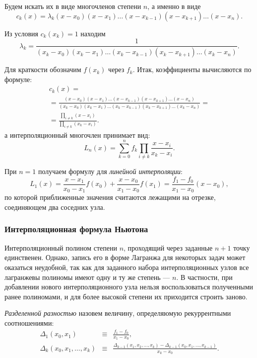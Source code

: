 Будем искать их в виде многочленов степени $n$, а именно в виде
\[
c_{k}(x)=\lambda_{k}(x-x_{0})(x-x_{1})\dots(x-x_{k-1})(x-x_{k+1})\dots(x-x_{n}).
\]


Из условия $c_{k}(x_{k})=1$ находим
\[
\lambda_{k}=\frac{1}{(x_{k}-x_{0})(x_{k}-x_{1})\dots(x_{k}-x_{k-1})(x_{k}-x_{k+1})\dots(x_{k}-x_{n})}.
\]


Для краткости обозначим $f(x_{k})$ через $f_{k}$. Итак, коэффициенты
вычисляются по формуле:
\begin{multline*}
c_{k}(x)=\\
=\frac{(x-x_{0})(x-x_{1})\dots(x-x_{k-1})(x-x_{k+1})\dots(x-x_{n})}{(x_{k}-x_{0})(x_{k}-x_{1})\dots(x_{k}-x_{k-1})(x_{k}-x_{k+1})\dots(x_{k}-x_{n})}=\\
=\frac{\prod_{i\neq k}(x-x_{i})}{\prod_{i\neq k}(x_{k}-x_{i})}.
\end{multline*}
а интерполяционный многочлен принимает вид:
\[
L_{n}(x)=\sum_{k=0}^{n}f_{k}\prod_{i\neq k}\frac{x-x_{i}}{x_{k}-x_{i}}.
\]


При $n=1$ получаем формулу для \emph{линейной интерполяции}:
\[
L_{1}(x)=\frac{x-x_{1}}{x_{0}-x_{1}}f(x_{0})+\frac{x-x_{0}}{x_{1}-x_{0}}f(x_{1})=\frac{f_{1}-f_{0}}{x_{1}-x_{0}}(x-x_{0}),
\]
по которой приближенные значения считаются лежащими на отрезке, соединяющем
два соседних узла.


\subsubsection{Интерполяционная формула Ньютона}

Интерполяционный полином степени $n$, проходящий через заданные $n+1$
точку единственен. Однако, запись его в форме Лагранжа для некоторых
задач может оказаться неудобной, так как для заданного набора интерполяционных
узлов все лагранжевы полиномы имеют одну и ту же степень --- $n$.
В частности, при добавлении нового интерполяционного узла нельзя воспользоваться
полученными ранее полиномами, и для более высокой степени их приходится
строить заново.

\emph{Разделенной разностью}
назовем величину, определяюмую рекуррентными соотношениями:
\begin{eqnarray*}
\Delta_{1}(x_{0},x_{1}) & \equiv & \frac{f_{1}-f_{0}}{x_{1}-x_{0}},\\
\Delta_{k}(x_{0},x_{1},\dots,x_{k}) & \equiv & \frac{\Delta_{k-1}(x_{1},x_{2},\dots,x_{k})-\Delta_{k-1}(x_{0},x_{1},\dots,x_{k-1})}{x_{k}-x_{0}}.
\end{eqnarray*}


